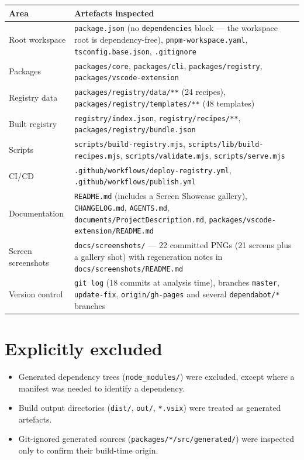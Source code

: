 \begin{table}[H]
\centering
\caption{Analysis scope and artefacts inspected}
\begin{longtable}{@{}L{4.4cm}L{10cm}@{}}
\toprule
\textbf{Area} & \textbf{Artefacts inspected} \\
\midrule
\endhead
Root workspace & \texttt{package.json} (no \texttt{dependencies} block --- the workspace root is dependency-free),
\texttt{pnpm-workspace.yaml}, \texttt{tsconfig.base.json}, \texttt{.gitignore} \\
Packages & \texttt{packages/core}, \texttt{packages/cli}, \texttt{packages/registry}, \texttt{packages/vscode-extension} \\
Registry data & \texttt{packages/registry/data/**} (24 recipes), \texttt{packages/registry/templates/**} (48 templates) \\
Built registry & \texttt{registry/index.json}, \texttt{registry/recipes/**}, \texttt{packages/registry/bundle.json} \\
Scripts & \texttt{scripts/build-registry.mjs}, \texttt{scripts/lib/build-recipes.mjs}, \texttt{scripts/validate.mjs}, \texttt{scripts/serve.mjs} \\
CI/CD & \texttt{.github/workflows/deploy-registry.yml}, \texttt{.github/workflows/publish.yml} \\
Documentation & \texttt{README.md} (includes a Screen Showcase gallery), \texttt{CHANGELOG.md}, \texttt{AGENTS.md}, \texttt{documents/ProjectDescription.md}, \texttt{packages/vscode-extension/README.md} \\
Screen screenshots & \texttt{docs/screenshots/} --- 22 committed PNGs (21 screens plus a gallery shot) with regeneration notes in \texttt{docs/screenshots/README.md} \\
Version control & \texttt{git log} (18 commits at analysis time), branches \texttt{master}, \texttt{update-fix}, \texttt{origin/gh-pages} and several \texttt{dependabot/*} branches \\
\bottomrule
\end{longtable}
\end{table}

\section*{Explicitly excluded}

\begin{itemize}
  \item Generated dependency trees (\texttt{node\_modules/}) were excluded, except
        where a manifest was needed to identify a dependency.
  \item Build output directories (\texttt{dist/}, \texttt{out/}, \texttt{*.vsix}) were
        treated as generated artefacts.
  \item Git-ignored generated sources (\texttt{packages/*/src/generated/}) were
        inspected only to confirm their build-time origin.
\end{itemize}

